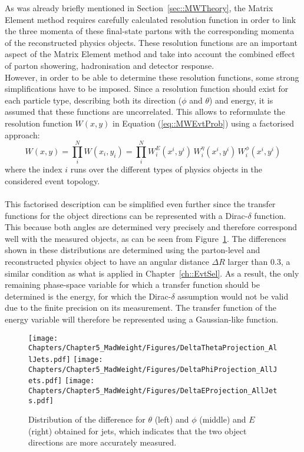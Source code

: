 As was already briefly mentioned in Section~\ref{sec::MWTheory}, the Matrix Element method requires carefully calculated resolution function in order to link the three momenta of these final-state partons with the corresponding momenta of the reconstructed physics objects.
These resolution functions are an important aspect of the Matrix Element method and take into account the combined effect of parton showering, hadronisation and detector response.
\\
However, in order to be able to determine these resolution functions, some strong simplifications have to be imposed.
Since a resolution function should exist for each particle type, describing both its direction ($\phi$ and $\theta$) and energy, it is assumed that these functions are uncorrelated.
This allows to reformulate the resolution function $W(x,y)$ in Equation (\ref{eq::MWEvtProb}) using a factorised approach:
\begin{equation}
 W(x,y) = \prod_{i}^{N} W(x_i, y_i) = \prod_{i}^{N} W_{i}^{E}(x^{i},y^i) \, W_{i}^{\eta}(x^i, y^i) \, W_{i}^{\phi}(x^i,y^i)
\end{equation}
where the index $i$ runs over the different types of physics objects in the considered event topology.
\\
\\
This factorised description can be simplified even further since the transfer functions for the object directions can be represented with a Dirac-$\delta$ function.
This because both angles are determined very precisely and therefore correspond well with the measured objects, as can be seen from Figure~\ref{fig::TFAngles}. The differences shown in these distributions are determined using the parton-level and reconstructed physics object to have an angular distance $\Delta R$ larger than 0.3, a similar condition as what is applied in Chapter~\ref{ch::EvtSel}.
As a result, the only remaining phase-space variable for which a transfer function should be determined is the energy, for which the Dirac-$\delta$ assumption would not be valid due to the finite precision on its measurement. The transfer function of the energy variable will therefore be represented using a Gaussian-like function.
\\
\begin{figure}[h!tp]
 \centering
 \texttt{[image: Chapters/Chapter5\_MadWeight/Figures/DeltaThetaProjection\_AllJets.pdf]} \hspace{0.1cm}
 \texttt{[image: Chapters/Chapter5\_MadWeight/Figures/DeltaPhiProjection\_AllJets.pdf]} \hspace{0.1cm}
 \texttt{[image: Chapters/Chapter5\_MadWeight/Figures/DeltaEProjection\_AllJets.pdf]}  
 \caption{Distribution of the difference for $\theta$ (left) and $\phi$ (middle) and $E$ (right) obtained for jets, which indicates that the two object directions are more accurately measured.} \label{fig::TFAngles}
\end{figure}

